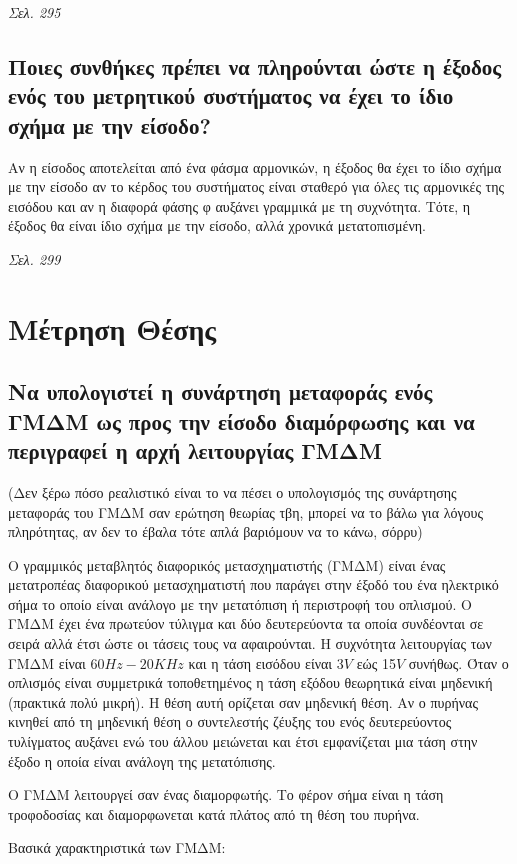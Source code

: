 \documentclass{article}
\begin{document}
\emph{Σελ. 295}
\subsection{Ποιες συνθήκες πρέπει να πληρούνται ώστε η έξοδος ενός του μετρητικού συστήματος να έχει το ίδιο σχήμα με την είσοδο?}
Αν η είσοδος αποτελείται από ένα φάσμα αρμονικών, η έξοδος θα έχει το ίδιο σχήμα με την είσοδο αν το κέρδος του συστήματος είναι σταθερό για
όλες τις αρμονικές της εισόδου και αν η διαφορά φάσης φ αυξάνει γραμμικά με τη συχνότητα. Τότε, η έξοδος θα είναι ίδιο σχήμα με την είσοδο,
αλλά χρονικά μετατοπισμένη. 

\emph{Σελ. 299}

\section{Μέτρηση Θέσης}
\subsection{Να υπολογιστεί η συνάρτηση μεταφοράς ενός ΓΜΔΜ ως προς την είσοδο διαμόρφωσης και να περιγραφεί η αρχή λειτουργίας ΓΜΔΜ}
(Δεν ξέρω πόσο ρεαλιστικό είναι το να πέσει ο υπολογισμός της συνάρτησης μεταφοράς του ΓΜΔΜ σαν ερώτηση θεωρίας τβη, μπορεί να το βάλω για λόγους πληρότητας, αν δεν το έβαλα τότε
απλά βαριόμουν να το κάνω, σόρρυ)

Ο γραμμικός μεταβλητός διαφορικός μετασχηματιστής (ΓΜΔΜ) είναι ένας μετατροπέας διαφορικού μετασχηματιστή που παράγει στην έξοδό του ένα ηλεκτρικό σήμα το οποίο είναι ανάλογο με την 
μετατόπιση ή περιστροφή του οπλισμού. Ο ΓΜΔΜ έχει ένα πρωτεύον τύλιγμα και δύο δευτερεύοντα τα οποία συνδέονται σε σειρά αλλά έτσι ώστε οι τάσεις τους να αφαιρούνται. Η συχνότητα 
λειτουργίας των ΓΜΔΜ είναι $60Hz-20KHz$ και η τάση εισόδου είναι 3$V$ εώς 15$V$ συνήθως. Όταν ο οπλισμός είναι συμμετρικά τοποθετημένος η τάση εξόδου θεωρητικά είναι μηδενική (πρακτικά
πολύ μικρή). Η θέση αυτή ορίζεται σαν μηδενική θέση. Αν ο πυρήνας κινηθεί από τη μηδενική θέση ο συντελεστής ζέυξης του ενός δευτερεύοντος τυλίγματος αυξάνει ενώ του άλλου 
μειώνεται και έτσι εμφανίζεται μια τάση στην έξοδο η οποία είναι ανάλογη της μετατόπισης.

O ΓΜΔΜ λειτουργεί σαν ένας διαμορφωτής. Το φέρον σήμα είναι η τάση τροφοδοσίας και διαμορφωνεται κατά πλάτος από τη θέση του πυρήνα. 

Βασικά χαρακτηριστικά των ΓΜΔΜ: 
\end{document}
